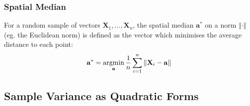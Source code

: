 \documentclass[11pt]{report} %
\begin{document}
\subsubsection{Spatial Median}

For a random sample of vectors $\mathbf{X}_{1}, \dots, \mathbf{X}_{n}$, the spatial median $\mathbf{a}^{*}$ on a norm $\left\Vert\cdot\right\Vert$ (eg. the Euclidean norm) is defined as the vector which minimises the average distance to each point:
\begin{equation}
\mathbf{a}^{*} = \operatorname*{argmin}_{\mathbf{a}} \dfrac{1}{n}\sum_{i = 1}^{n}\left\Vert \mathbf{X}_{i} - \mathbf{a}\right\Vert
\end{equation}

\subsection{Sample Variance as Quadratic Forms}
\end{document}
